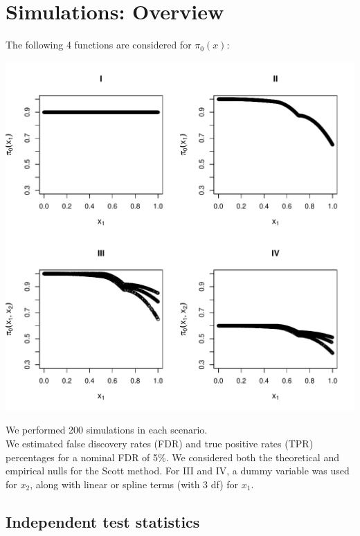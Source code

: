 \documentclass{article}\usepackage[]{graphicx}\usepackage[]{color}
\makeatletter
\def\maxwidth{ %
  \ifdim\Gin@nat@width>\linewidth
    \linewidth
  \else
    \Gin@nat@width
  \fi
}
\newenvironment{knitrout}{}{} %
\makeatother
\begin{document}
\section*{Simulations: Overview}

The following 4 functions are considered for $\pi_0(x)$:
\begin{knitrout}
\color{fgcolor}

{\centering \includegraphics[width=\maxwidth]{Figures/Simulation_scenarios-1} 

}



\end{knitrout}

\noindent We performed 200 simulations in each scenario.
\\  
\noindent We estimated false discovery rates (FDR) and true positive rates (TPR) percentages for a nominal FDR of 5\%. 
We considered both the theoretical and empirical nulls for the Scott method.
For III and IV, a dummy variable was used for $x_{2}$, along with linear or spline terms (with 3 df) for $x_1$.

\clearpage

\subsection*{Independent test statistics}
\end{document}
